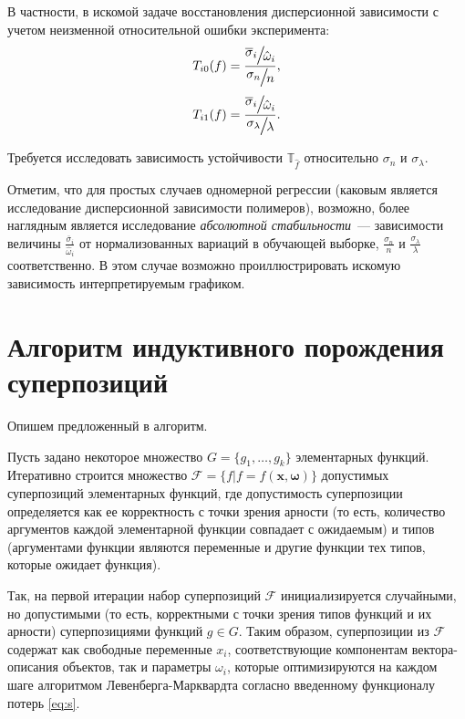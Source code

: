 \documentclass[11pt,a4paper]{article}
\theoremstyle{definition}
\begin{document}
В частности, в искомой задаче восстановления дисперсионной зависимости с учетом неизменной
относительной ошибки эксперимента:
\[
  \Large
  T_{i0}(f) = \frac{\sfrac{\overline{\sigma}_i}{\hat{\omega}_i}}{\sfrac{\sigma_n}{n}},
\]
\[
  \Large
  T_{i1}(f) = \frac{\sfrac{\overline{\sigma}_i}{\hat{\omega}_i}}{\sfrac{\sigma_{\lambda}}{\lambda}}.
\]

Требуется исследовать зависимость устойчивости $\mathbb{T}_{\hat{f}}$ относительно
$\sigma_n$ и $\sigma_{\lambda}$.

Отметим, что для простых случаев одномерной регрессии (каковым является исследование
дисперсионной зависимости полимеров), возможно, более наглядным является исследование
\emph{абсолютной стабильности}~--- зависимости величины
$\frac{\overline{\sigma}_i}{\hat{\omega}_i}$ от нормализованных вариаций в обучающей
выборке, $\frac{\sigma_n}{n}$ и $\frac{\sigma_{\lambda}}{\lambda}$ соответственно.
В этом случае возможно проиллюстрировать искомую зависимость интерпретируемым графиком.

\section{Алгоритм индуктивного порождения суперпозиций}

Опишем предложенный в \cite{Rudoy13} алгоритм.

Пусть задано некоторое множество $G = \{ g_1, \dots, g_k \}$ элементарных функций.
Итеративно строится множество $\mathcal{F} = \{ f | f = f(\boldsymbol{x}, \boldsymbol{\omega}) \}$
допустимых суперпозиций элементарных
функций, где допустимость суперпозиции определяется как ее корректность с точки
зрения арности (то есть, количество аргументов каждой элементарной функции совпадает
с ожидаемым) и типов (аргументами функции являются переменные и другие функции тех типов,
которые ожидает функция).

Так, на первой итерации набор суперпозиций $\mathcal{F}$
инициализируется случайными, но допустимыми (то есть, корректными с точки зрения типов
функций и их арности) суперпозициями функций $g \in G$. Таким образом, суперпозиции из
$\mathcal{F}$ содержат как свободные переменные $x_i$, соответствующие
компонентам вектора-описания объектов, так и параметры $\omega_i$, которые
оптимизируются на каждом шаге алгоритмом Левенберга-Марквардта
согласно введенному функционалу потерь \eqref{eq:s}.
\end{document}
